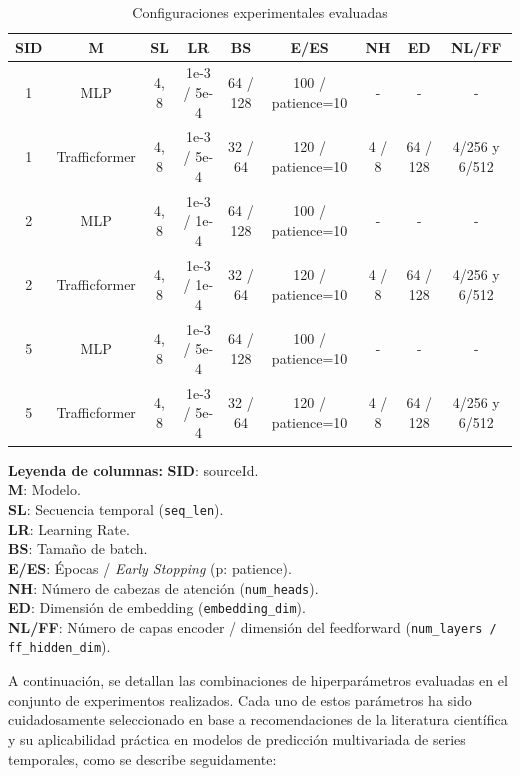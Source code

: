 \begin{table}[H]
	\centering
	\small
	\caption{Configuraciones experimentales evaluadas}
	\label{tab:experimentos_resumen}
	\begin{tabularx}{\textwidth}{c | c | c | c | c | c | c | c | c}
		\toprule
		\textbf{SID} & \textbf{M} & \textbf{SL} & \textbf{LR} & \textbf{BS} & \textbf{E/ES} & \textbf{NH} & \textbf{ED} & \textbf{NL/FF} \\
		\midrule
		1 & MLP           & 4, 8 & 1e-3 / 5e-4 & 64 / 128 & 100 / patience=10 & -      & -       & - \\
		1 & Trafficformer & 4, 8 & 1e-3 / 5e-4 & 32 / 64  & 120 / patience=10 & 4 / 8  & 64 / 128 & 4/256 y 6/512 \\
		2 & MLP           & 4, 8 & 1e-3 / 1e-4 & 64 / 128 & 100 / patience=10 & -      & -       & - \\
		2 & Trafficformer & 4, 8 & 1e-3 / 1e-4 & 32 / 64  & 120 / patience=10 & 4 / 8  & 64 / 128 & 4/256 y 6/512 \\
		5 & MLP           & 4, 8 & 1e-3 / 5e-4 & 64 / 128 & 100 / patience=10 & -      & -       & - \\
		5 & Trafficformer & 4, 8 & 1e-3 / 5e-4 & 32 / 64  & 120 / patience=10 & 4 / 8  & 64 / 128 & 4/256 y 6/512 \\
		\bottomrule
	\end{tabularx}
	\vspace{0.5em}
	\begin{minipage}{0.98\textwidth}
	\footnotesize
	\textbf{Leyenda de columnas:} 
	\textbf{SID}: sourceId. \\
	\textbf{M}: Modelo. \\
	\textbf{SL}: Secuencia temporal (\texttt{seq\_len}). \\
	\textbf{LR}: Learning Rate. \\
	\textbf{BS}: Tamaño de batch. \\
	\textbf{E/ES}: Épocas / \textit{Early Stopping} (p: patience). \\
	\textbf{NH}: Número de cabezas de atención (\texttt{num\_heads}). \\
	\textbf{ED}: Dimensión de embedding (\texttt{embedding\_dim}). \\
	\textbf{NL/FF}: Número de capas encoder / dimensión del feedforward (\texttt{num\_layers / ff\_hidden\_dim}).
	\end{minipage}
\end{table}

A continuación, se detallan las combinaciones de hiperparámetros evaluadas en el conjunto de experimentos realizados. Cada uno de estos parámetros ha sido cuidadosamente seleccionado en base a recomendaciones de la literatura científica y su aplicabilidad práctica en modelos de predicción multivariada de series temporales, como se describe seguidamente:

